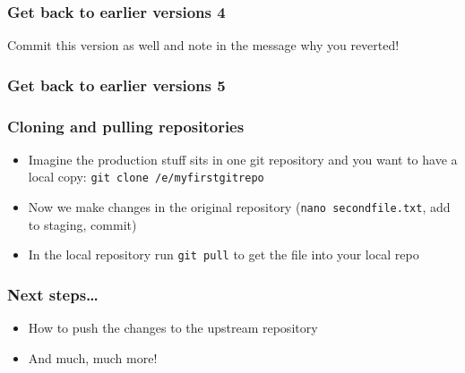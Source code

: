 \documentclass[12pt,english]{beamer}
\begin{document}
\begin{frame}
\frametitle{Get back to earlier versions 4}

\begin{center}
\end{center}

Commit this version as well and note in the message why you reverted!

\end{frame}

\begin{frame}
\frametitle{Get back to earlier versions 5}

\begin{center}
\end{center}

\end{frame}

\begin{frame}
\frametitle{Cloning and pulling repositories}

\begin{itemize}
\item Imagine the production stuff sits in one git repository and you want to have a local copy: \texttt{git clone /e/myfirstgitrepo}
\item Now we make changes in the original repository (\texttt{nano secondfile.txt}, add to staging, commit)
\item In the local repository run \texttt{git pull} to get the file into your local repo
\end{itemize}
\end{frame}


\begin{frame}
\frametitle{Next steps\ldots}

\begin{itemize}
\item How to push the changes to the upstream repository
\item And much, much more!
\end{itemize}
\end{frame}
\end{document}
